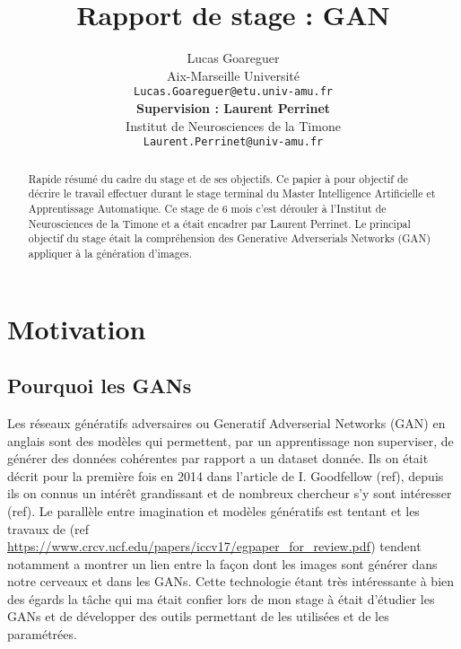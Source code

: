 \documentclass[11pt,francais]{article}
\title{Rapport de stage : GAN}
\author{Lucas Goareguer \\
  Aix-Marseille Université \\
  {\small \texttt{Lucas.Goareguer@etu.univ-amu.fr}   } \\\And
   {\bf Supervision : Laurent Perrinet} \\
  Institut de Neurosciences de la Timone \\
  {\small \tt Laurent.Perrinet@univ-amu.fr} \\}
\date{}
\begin{document}
\maketitle
\begin{abstract}
Rapide résumé du cadre du stage et de ses objectifs.
Ce papier à pour objectif de décrire le travail effectuer durant le stage terminal du Master Intelligence Artificielle et Apprentissage Automatique.
Ce stage de 6 mois c'est dérouler à l'Institut de Neurosciences de la Timone et a était encadrer par Laurent Perrinet.
Le principal objectif du stage était la compréhension des Generative Adverserials Networks (GAN) appliquer à la génération d'images.
\end{abstract}


\section{Motivation}

\subsection{Pourquoi les GANs}
Les réseaux génératifs adversaires ou Generatif Adverserial Networks (GAN) en anglais sont des modèles qui permettent, par un apprentissage non superviser, de générer des données cohérentes par rapport a un dataset donnée. Ils on était décrit pour la première fois en 2014 dans l'article de I. Goodfellow (ref), depuis ils on connus un intérêt grandissant et de nombreux chercheur s'y sont intéresser (ref). 
Le parallèle entre imagination et modèles génératifs est tentant et les travaux de (ref \url{https://www.crcv.ucf.edu/papers/iccv17/egpaper_for_review.pdf}) tendent notamment a montrer un lien entre la façon dont les images sont générer dans notre cerveaux et dans les GANs. 
Cette technologie étant très intéressante à bien des égards la tâche qui ma était confier lors de mon stage à était d'étudier les GANs et de développer des outils permettant de les utilisées et de les paramétrées. 
\end{document}
